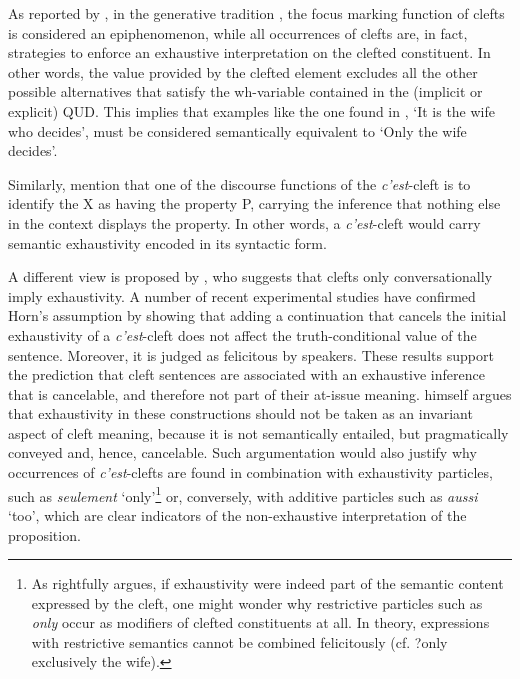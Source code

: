 As reported by \textcite{dufter2009clefting}, in the generative tradition \parencite{szabolcsi1981semantics, kiss1998identificational, gussenhoven2008types}, the focus marking function of clefts is considered an epiphenomenon, while all occurrences of clefts are, in fact, strategies to enforce an exhaustive interpretation on the clefted constituent. In other words, the value provided by the  clefted element excludes all the other possible alternatives that satisfy the wh-variable contained in the (implicit or explicit) QUD. This implies that examples like the one found in \textcite[88-89]{jespersen1927modern}, `It is the wife who decides', must be considered semantically equivalent to `Only the wife decides'. 

Similarly, \textcite{lambrecht2001framework, katz1997syntactic} mention that one of the discourse functions of the \textit{c’est}-cleft is to identify the X as having the property P, carrying the inference that nothing else in the context displays the property. In other words, a \textit{c’est}-cleft would carry semantic exhaustivity encoded in its syntactic form.

A different view is proposed by \textcite{horn1981exhaustiveness}, who suggests that clefts only conversationally imply exhaustivity.
A number of recent experimental studies \parencite{destruel2018interpretation, de2018experimental} have confirmed Horn’s assumption by showing that adding a continuation that cancels the initial exhaustivity of a \textit{c’est}-cleft does not affect the truth-conditional value of the sentence. Moreover, it is judged as felicitous by speakers. These results support the prediction that cleft sentences are associated with an exhaustive inference that is cancelable, and therefore not part of their at-issue meaning. \textcite{dufter2009clefting} himself argues that exhaustivity in these constructions should not be taken as an invariant aspect of cleft meaning, because it is not semantically entailed, but pragmatically conveyed and, hence, cancelable. Such argumentation would also justify why occurrences of \textit{c’est}-clefts are found in combination with exhaustivity particles, such as \textit{seulement} ‘only’\footnote{As \textcite{dufter2009clefting} rightfully argues, if  exhaustivity were  indeed  part  of  the  semantic  content  expressed  by  the  cleft, one might wonder why restrictive particles such as \textit{only} occur as modifiers of clefted constituents at all. In theory, expressions  with  restrictive semantics cannot be combined felicitously (cf. ?only exclusively the wife).}  or, conversely, with additive particles such as \textit{aussi} ‘too’, which are clear indicators of the non-exhaustive interpretation of the proposition. 

